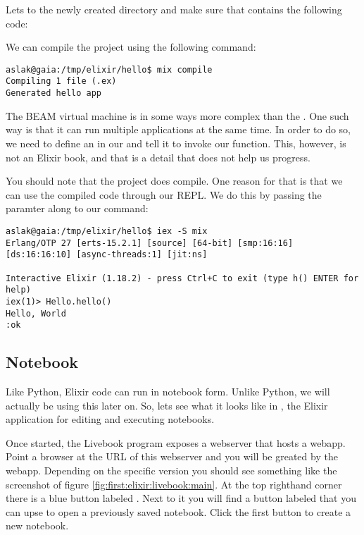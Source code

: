 Lets  to the newly created directory and make sure that  contains the following code:


We can compile the project using the following  command:

\begin{verbatim}
aslak@gaia:/tmp/elixir/hello$ mix compile
Compiling 1 file (.ex)
Generated hello app
\end{verbatim}

The BEAM virtual machine is in some ways more complex than the . One such way is that it can run multiple applications at the same time. In order to do so, we need to define an  in our  and tell it to invoke our  function. This, however, is not an Elixir book, and that is a detail that does not help us progress.

You should note that the project does compile. One reason for that is that we can use the compiled code through our REPL. We do this by passing the  paramter along to our  command:

\begin{verbatim}
aslak@gaia:/tmp/elixir/hello$ iex -S mix
Erlang/OTP 27 [erts-15.2.1] [source] [64-bit] [smp:16:16] [ds:16:16:10] [async-threads:1] [jit:ns]

Interactive Elixir (1.18.2) - press Ctrl+C to exit (type h() ENTER for help)
iex(1)> Hello.hello()
Hello, World
:ok
\end{verbatim}

\subsection{Notebook}

Like Python, Elixir code can run in notebook form. Unlike Python, we will actually be using this later on. So, lets see what it looks like in , the Elixir application for editing and executing notebooks.

Once started, the Livebook program exposes a webserver that hosts a webapp. Point a browser at the URL of this webserver and you will be greated by the webapp. Depending on the specific version you should see something like the screenshot of figure \ref{fig:first:elixir:livebook:main}. At the top righthand corner there is a blue button labeled . Next to it you will find a button labeled  that you can upse to open a previously saved notebook. Click the first button to create a new notebook.

